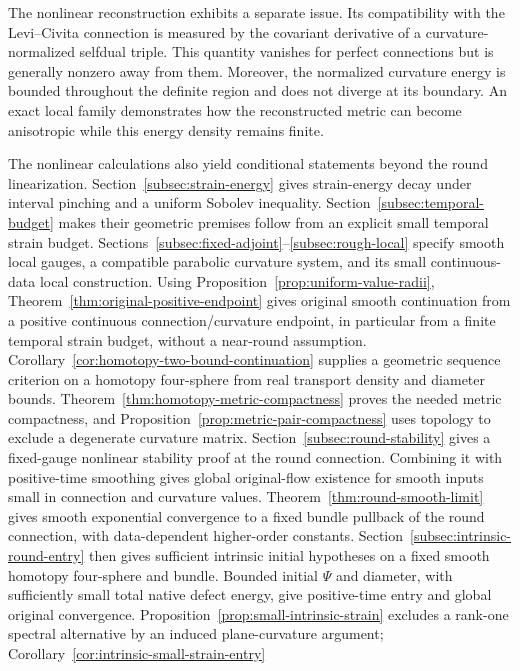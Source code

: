 \documentclass[11pt]{article}
\numberwithin{equation}{section}
\theoremstyle{definition}
\theoremstyle{remark}
\begin{document}
The nonlinear reconstruction exhibits a separate issue. Its compatibility with the Levi--Civita connection is measured by the covariant derivative of a curvature-normalized selfdual triple. This quantity vanishes for perfect connections but is generally nonzero away from them. Moreover, the normalized curvature energy is bounded throughout the definite region and does not diverge at its boundary. An exact local family demonstrates how the reconstructed metric can become anisotropic while this energy density remains finite.

The nonlinear calculations also yield conditional statements beyond the
round linearization. Section~\ref{subsec:strain-energy} gives strain-energy
decay under interval pinching and a uniform Sobolev inequality.
Section~\ref{subsec:temporal-budget} makes their geometric premises follow
from an explicit small temporal strain budget.
Sections~\ref{subsec:fixed-adjoint}--\ref{subsec:rough-local}
specify smooth local gauges, a compatible parabolic curvature system,
and its small continuous-data local construction.
Using Proposition~\ref{prop:uniform-value-radii},
Theorem~\ref{thm:original-positive-endpoint} gives original
smooth continuation from a positive continuous connection/curvature
endpoint, in particular from a finite temporal strain budget,
without a near-round assumption.
Corollary~\ref{cor:homotopy-two-bound-continuation} supplies a
geometric sequence criterion on a homotopy four-sphere from
real transport density and diameter bounds.
Theorem~\ref{thm:homotopy-metric-compactness} proves the needed
metric compactness, and Proposition~\ref{prop:metric-pair-compactness}
uses topology to exclude a degenerate curvature matrix.
Section~\ref{subsec:round-stability} gives a fixed-gauge
nonlinear stability proof at the round connection. Combining it
with positive-time smoothing gives global original-flow
existence for smooth inputs small in connection and curvature
values. Theorem~\ref{thm:round-smooth-limit} gives smooth
exponential convergence to a fixed bundle pullback of the
round connection, with data-dependent higher-order constants.
Section~\ref{subsec:intrinsic-round-entry} then gives sufficient
intrinsic initial hypotheses on a fixed smooth homotopy
four-sphere and bundle. Bounded initial $\Psi$ and diameter,
with sufficiently small total native defect energy, give
positive-time entry and global original convergence.
Proposition~\ref{prop:small-intrinsic-strain} excludes a
rank-one spectral alternative by an induced plane-curvature
argument; Corollary~\ref{cor:intrinsic-small-strain-entry}
\end{document}
